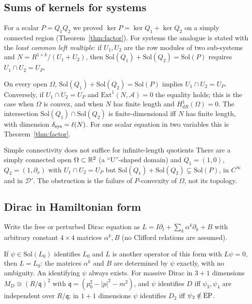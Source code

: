 \subsection{Sums of kernels for systems}

For a scalar $P=Q_1Q_2$ we proved $\ker P=\ker Q_1+\ker Q_2$ on a simply connected region (Theorem~\ref{thm:factor}). For systems the analogue is stated with the \emph{least common left multiple}: if $U_1,U_2$ are the row modules of two sub-systems and $N=R^{1\times k}/(U_1+U_2)$, then $\mathrm{Sol}(Q_1)+\mathrm{Sol}(Q_2)=\mathrm{Sol}(P)$ requires $U_1\cap U_2=U_P$.

\begin{theorem}\label{thm:syss1}
On every open $\Omega$, $\mathrm{Sol}(Q_1)+\mathrm{Sol}(Q_2)=\mathrm{Sol}(P)$ implies $U_1\cap U_2=U_P$. Conversely, if $U_1\cap U_2=U_P$ and $\mathrm{Ext}^1(N,\mathcal A)=0$ the equality holds; this is the case when $\Omega$ is convex, and when $N$ has finite length and $H^1_{dR}(\Omega)=0$. The intersection $\mathrm{Sol}(Q_1)\cap\mathrm{Sol}(Q_2)$ is finite-dimensional iff $N$ has finite length, with dimension $\delta_{\rm sys}=\ell(N)$. For one scalar equation in two variables this is Theorem~\ref{thm:factor}.
\end{theorem}

\begin{falsebox}{Simple connectivity does not suffice for infinite-length quotients}{\falsest}\label{cex:syss1}
There are a simply connected open $\Omega\subset\mathbb{R}^2$ (a ``U''-shaped domain) and $Q_1=(1,0)$, $Q_2=(1,\partial_x)$ with $U_1\cap U_2=U_P$ but $\mathrm{Sol}(Q_1)+\mathrm{Sol}(Q_2)\subsetneq\mathrm{Sol}(P)$, in $C^\infty$ and in $\mathcal D'$. The obstruction is the failure of $P$-convexity of $\Omega$, not its topology.
\end{falsebox}

\subsection{Dirac in Hamiltonian form}

Write the free or perturbed Dirac equation as $L=I\partial_t+\sum_k\alpha^k\partial_k+B$ with arbitrary constant $4\times4$ matrices $\alpha^k,B$ (no Clifford relations are assumed).

\begin{theorem}\label{thm:hdirac}
If $\psi\in\mathrm{Sol}(L_0)$ identifies $L_0$ and $L$ is another operator of this form with $L\psi=0$, then $L=L_0$: the matrices $\alpha^k$ and $B$ are determined by $\psi$ exactly, with no ambiguity. An identifying $\psi$ always exists. For massive Dirac in $3+1$ dimensions $M_D\cong(R/\mathfrak q)^{2}$ with $\mathfrak q=(p_0^2-|p|^2-m^2)$, and $\psi$ identifies $D$ iff $\psi_3,\psi_4$ are independent over $R/\mathfrak q$; in $1+1$ dimensions $\psi$ identifies $D_2$ iff $\psi_2\notin\mathrm{EP}$.
\end{theorem}

